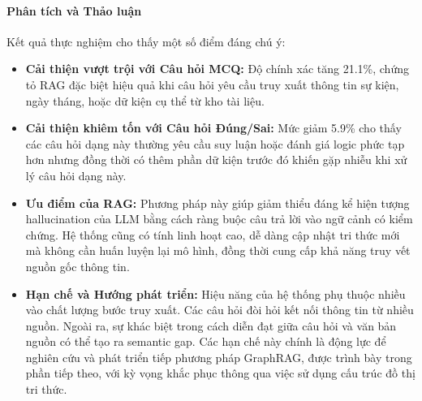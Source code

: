 \paragraph{Phân tích và Thảo luận}
Kết quả thực nghiệm cho thấy một số điểm đáng chú ý:
\begin{itemize}
    \item \textbf{Cải thiện vượt trội với Câu hỏi MCQ:} Độ chính xác tăng 21.1\%, chứng tỏ RAG đặc biệt hiệu quả khi câu hỏi yêu cầu truy xuất thông tin sự kiện, ngày tháng, hoặc dữ kiện cụ thể từ kho tài liệu.
    \item \textbf{Cải thiện khiêm tốn với Câu hỏi Đúng/Sai:} Mức giảm 5.9\% cho thấy các câu hỏi dạng này thường yêu cầu suy luận hoặc đánh giá logic phức tạp hơn nhưng đồng thời có thêm phần dữ kiện trước đó khiến gặp nhiễu khi xử lý câu hỏi dạng này. 
    \item \textbf{Ưu điểm của RAG:} Phương pháp này giúp giảm thiểu đáng kể hiện tượng hallucination của LLM bằng cách ràng buộc câu trả lời vào ngữ cảnh có kiểm chứng. Hệ thống cũng có tính linh hoạt cao, dễ dàng cập nhật tri thức mới mà không cần huấn luyện lại mô hình, đồng thời cung cấp khả năng truy vết nguồn gốc thông tin.
    \item \textbf{Hạn chế và Hướng phát triển:} Hiệu năng của hệ thống phụ thuộc nhiều vào chất lượng bước truy xuất. Các câu hỏi đòi hỏi kết nối thông tin từ nhiều nguồn. Ngoài ra, sự khác biệt trong cách diễn đạt giữa câu hỏi và văn bản nguồn có thể tạo ra semantic gap. Các hạn chế này chính là động lực để nghiên cứu và phát triển tiếp phương pháp GraphRAG, được trình bày trong phần tiếp theo, với kỳ vọng khắc phục thông qua việc sử dụng cấu trúc đồ thị tri thức.
\end{itemize}